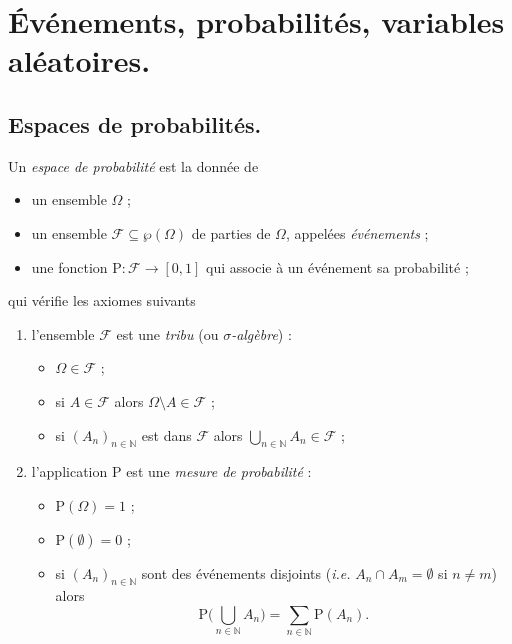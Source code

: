 \documentclass[./main]{subfiles}
\begin{document}
  \chapter{Événements, probabilités, variables aléatoires.}

  \section{Espaces de probabilités.}

  \begin{defn}
    Un \textit{espace de probabilité} est la donnée de 
    \begin{itemize}
      \item un ensemble $\Omega$ ;
      \item un ensemble $\mathcal{F} \subseteq \wp(\Omega)$ de parties de $\Omega$, appelées \textit{événements} ;
      \item une fonction $\mathrm{P} : \mathcal{F} \to [0,1]$ qui associe à un événement sa probabilité ;
    \end{itemize}
    qui vérifie les axiomes suivants 
    \begin{enumerate}
      \item l'ensemble $\mathcal{F}$ est une  \textit{tribu} (ou \textit{$\sigma$-algèbre}) :
        \begin{itemize}
          \item $\Omega \in \mathcal{F}$ ;
          \item si $A \in \mathcal{F}$ alors $\Omega \setminus A \in \mathcal{F}$ ;
          \item si $(A_n)_{n \in \mathds{N}}$ est dans $\mathcal{F}$ alors $\bigcup_{n \in \mathds{N}} A_n \in \mathcal{F}$ ;
        \end{itemize}
      \item l'application $\mathrm{P}$ est une \textit{mesure de probabilité} :
        \begin{itemize}
          \item $\mathrm{P}(\Omega) = 1$ ;
          \item $\mathrm{P}(\emptyset) = 0$ ;
          \item{} si $(A_n)_{n \in \mathds{N}}$ sont des événements disjoints (\textit{i.e.} $A_n \cap A_m = \emptyset$ si $n \neq m$) alors \[
          \mathrm{P}\Big( \bigcup_{n \in \mathds{N}} A_n \Big) = \sum_{n \in \mathds{N}} \mathrm{P}(A_n)
          .\]
        \end{itemize}
    \end{enumerate}
  \end{defn}
\end{document}
